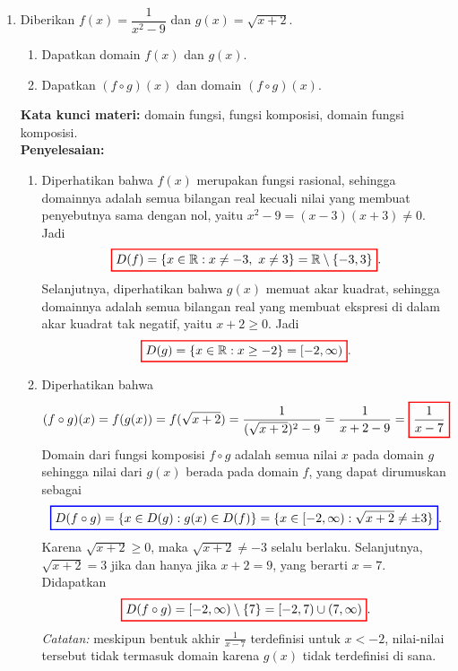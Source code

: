 \documentclass[10pt,openany,a4paper]{article}
\theoremstyle{definition}
\theoremstyle{definition}
\theoremstyle{plain}
\newenvironment{jawab}[2][tes]{%
\par\noindent\textbf{Kata kunci materi:} #1.\\
\textbf{Penyelesaian:} #2%
}{}
\begin{document}
\begin{enumerate}
    \item Diberikan $f(x)=\dfrac{1}{x^2-9}$ dan $g(x)=\sqrt{x+2}$.
    \begin{enumerate}
        \item Dapatkan domain $f(x)$ dan $g(x)$.
        \item Dapatkan $(f\circ g)(x)$ dan domain $(f\circ g)(x)$.
    \end{enumerate}
    \begin{jawab}[domain fungsi, fungsi komposisi, domain fungsi komposisi]{
        \begin{enumerate}
            \item Diperhatikan bahwa $f(x)$ merupakan fungsi rasional, sehingga domainnya adalah semua bilangan real kecuali nilai yang membuat penyebutnya sama dengan nol, yaitu $x^2-9=(x-3)(x+3)\neq 0$. Jadi
            \[
            \colorlet{oldcolor}{.}
        \color{red}
        \setlength{\fboxrule}{1pt} \boxed{\color{oldcolor}D(f)=\{x \in \mathbb{R} : x \neq -3,~x\neq 3\}=\mathbb{R}\setminus\{-3,3\}}\color{oldcolor}.
            \]
            Selanjutnya, diperhatikan bahwa $g(x)$ memuat akar kuadrat, sehingga domainnya adalah semua bilangan real yang membuat ekspresi di dalam akar kuadrat tak negatif, yaitu $x+2\geq 0$. Jadi
            \[
            \colorlet{oldcolor}{.}
        \color{red}
        \setlength{\fboxrule}{1pt} \boxed{\color{oldcolor}D(g)=\{x \in \mathbb{R} : x \geq -2\}=[-2,\infty)}\color{oldcolor}.
            \]
            \item Diperhatikan bahwa
            \begin{align*}
                (f\circ g)(x) = f(g(x)) = f(\sqrt{x+2}) = \frac{1}{(\sqrt{x+2})^2 - 9} = \frac{1}{x+2-9} = \colorlet{oldcolor}{.}
        \color{red}
        \setlength{\fboxrule}{1pt} \boxed{\color{oldcolor}\frac{1}{x-7}}\color{oldcolor}
            \end{align*}
            Domain dari fungsi komposisi $f\circ g$ adalah semua nilai $x$ pada domain $g$ sehingga nilai dari $g(x)$ berada pada domain $f$, yang dapat dirumuskan sebagai
            \begin{align*}
                \colorlet{oldcolor}{.}
        \color{blue}
        \setlength{\fboxrule}{1pt} \boxed{\color{oldcolor}D(f\circ g) = \{x \in D(g) : g(x) \in D(f)\} = \{x \in [-2, \infty) : \sqrt{x+2} \neq \pm 3\}}\color{oldcolor}.
            \end{align*}
            Karena $\sqrt{x+2}\geq 0$, maka $\sqrt{x+2}\neq -3$ selalu berlaku. Selanjutnya, $\sqrt{x+2} = 3$ jika dan hanya jika $x+2=9$, yang berarti $x = 7$. Didapatkan
            \begin{align*}
                \colorlet{oldcolor}{.}
        \color{red}
        \setlength{\fboxrule}{1pt} \boxed{\color{oldcolor}D(f\circ g) = [-2, \infty) \setminus \{7\} = [-2, 7) \cup (7, \infty)}\color{oldcolor}.
            \end{align*}
            \textit{Catatan:} meskipun bentuk akhir $\frac{1}{x-7}$ terdefinisi untuk $x<-2$, nilai-nilai tersebut tidak termasuk domain karena $g(x)$ tidak terdefinisi di sana.
        \end{enumerate}
    }
    \end{jawab}


\end{enumerate}
\end{document}
